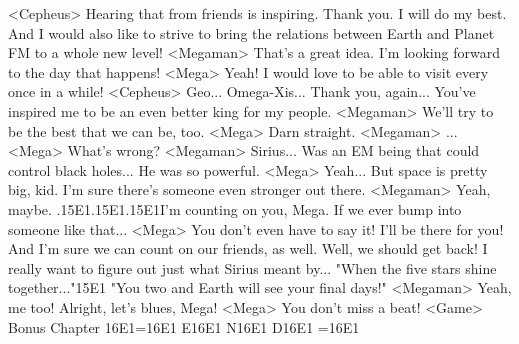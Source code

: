 <Cepheus> Hearing that from friends is inspiring. Thank you. 
I will do my best. 
And I would also like to strive to bring the relations 
between Earth and Planet FM to a whole new level! 
<Megaman> That's a great idea. I'm looking forward to the day that happens! 
<Mega> Yeah! I would love to be able to visit every once in a while! 
<Cepheus> Geo... Omega-Xis... Thank you, again... 
You've inspired me to be an even better king for my people. 
<Megaman> We'll try to be the best that we can be, too. 
<Mega> Darn straight. 
<Megaman> ... 
<Mega> What's wrong? 
<Megaman> Sirius... Was an EM being that could control black holes... 
He was so powerful. 
<Mega> Yeah... 
But space is pretty big, kid. I'm sure there's someone even stronger out there. 
<Megaman> Yeah, maybe. 
.{15}{E1}.{15}{E1}.{15}{E1}I'm counting on you, Mega. If we ever bump into someone like that... 
<Mega> You don't even have to say it! I'll be there for you! 
And I'm sure we can count on our friends, as well. 
Well, we should get back! 
I really want to figure out just what Sirius meant by... 
"When the five stars shine together..."{15}{E1} 
"You two and Earth will see your final days!" 
<Megaman> Yeah, me too! 
Alright, let's blues, Mega! 
<Mega> You don't miss a beat! 
<Game>   Bonus Chapter     {16}{E1}={16}{E1} E{16}{E1} N{16}{E1} D{16}{E1} ={16}{E1}   
